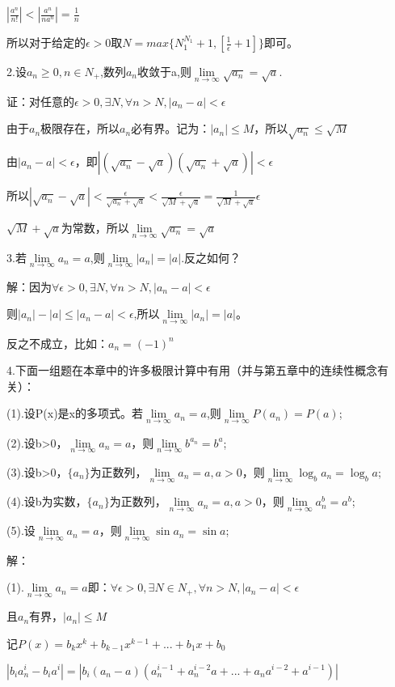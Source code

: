 \documentclass[12pt]{ctexart}
\begin{document}
$|\frac{a^n}{n!}|<|\frac{a^n}{na^n}|=\frac{1}{n}$

所以对于给定的$\epsilon>0$取$N=max\{N_1^{N_1}+1,[\frac{1}{\epsilon}+1]\}$即可。

2.设$a_n\ge0,n\in{N_+}$,数列$a_n$收敛于a,则$\lim\limits_{n\to\infty}\sqrt{a_n}=\sqrt{a}$.

证：对任意的$\epsilon>0,\exists{N},\forall{}n>N,|a_n-a|<\epsilon$

由于$a_n$极限存在，所以$a_n$必有界。记为：$|a_n|\le{M}$，所以$\sqrt{a_n}\le\sqrt{M}$

由$|a_n-a|<\epsilon$，即$|(\sqrt{a_n}-\sqrt{a})(\sqrt{a_n}+\sqrt{a})|<\epsilon$

所以$|\sqrt{a_n}-\sqrt{a}|<\frac{\epsilon}{\sqrt{a_n}+\sqrt{a}}<\frac{\epsilon}{\sqrt{M}+\sqrt{a}}=\frac{1}{\sqrt{M}+\sqrt{a}}\epsilon$

${\sqrt{M}+\sqrt{a}}$为常数，所以$\lim\limits_{n\to\infty}\sqrt{a_n}=\sqrt{a}$

3.若$\lim\limits_{n\to\infty}a_n=a$,则$\lim\limits_{n\to\infty}|a_n|=|a|$.反之如何？

解：因为$\forall\epsilon>0,\exists{}N,\forall{}n>N,|a_n-a|<\epsilon$

则$|a_n|-|a|\le|a_n-a|<\epsilon$,所以$\lim\limits_{n\to\infty}|a_n|=|a|$。

反之不成立，比如：$a_n={(-1)}^n$

4.下面一组题在本章中的许多极限计算中有用（并与第五章中的连续性概念有关）：

(1).设P(x)是x的多项式。若$\lim\limits_{n\to\infty}a_n=a$,则$\lim\limits_{n\to\infty}P(a_n)=P(a)$;

(2).设b>0，$\lim\limits_{n\to\infty}a_n=a$，则$\lim\limits_{n\to\infty}b^{a_n}=b^a$;

(3).设b>0，$\{a_n\}$为正数列，$\lim\limits_{n\to\infty}a_n=a,a>0$，则$\lim\limits_{n\to\infty}\log_{b}a_n=\log_{b}a$;

(4).设b为实数，$\{a_n\}$为正数列，$\lim\limits_{n\to\infty}a_n=a,a>0$，则$\lim\limits_{n\to\infty}a_n^b=a^b$;

(5).设$\lim\limits_{n\to\infty}a_n=a$，则$\lim\limits_{n\to\infty}\sin{a_n}=\sin{a}$;

解：

(1).$\lim\limits_{n\to\infty}a_n=a\textrm{即：}\forall\epsilon>0,\exists{}N\in{N_+},\forall{}n>N,|a_n-a|<\epsilon$

且$a_n$有界，$|a_n|\le{M}$

记$P(x)=b_kx^k+{b_{k-1}x^{k-1}}+...+{b_{1}x}+b_0$

$|b_ia_n^i-b_ia^i|=|b_i(a_n-a)(a_n^{i-1}+a_n^{i-2}a+...+a_na^{i-2}+a^{i-1})|$
\end{document}
